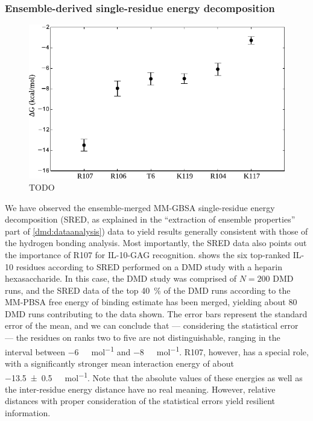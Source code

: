 \subsubsection{Ensemble-derived single-residue energy decomposition}

\begin{figure}
\centering
\includegraphics[width=1.0\textwidth]{gfx/dmdil10/round1_il10_SRED_hpdp6.pdf}
\caption[]{TODO}
\label{fig:dmdil10:SRED_hpdp6}
\end{figure}

We have observed the ensemble-merged MM-GBSA single-residue energy decomposition
(SRED, as explained in the \enquote{extraction of ensemble properties} part of
\cref{dmd:dataanalysis}) data to yield results generally consistent with those
of the hydrogen bonding analysis. Most importantly, the SRED data also points
out the importance of R107 for IL-10-GAG recognition.
 shows the six top-ranked IL-10 residues according
to SRED performed on a DMD study with a heparin hexasaccharide. In this case,
the DMD study was comprised of $N=200$ DMD runs, and the SRED data of the top
\SI{40}{\percent} of the DMD runs according to the MM-PBSA free energy of
binding estimate has been merged, yielding about 80 DMD runs contributing to the
data shown. The error bars represent the standard error of the mean, and we can
conclude that --- considering the statistical error --- the residues on ranks
two to five are not distinguishable, ranging in the interval between
\SI{-6}{\kilo\calory\per\mol} and \SI{-8}{\kilo\calory\per\mol}. R107, however,
has a special role, with a significantly stronger mean interaction energy of
about \SI{-13.5 +- 0.5}{\kilo\calory\per\mol}. Note that the absolute values of
these energies as well as the inter-residue energy distance have no real
meaning. However, relative distances with proper consideration of the
statistical errors yield resilient information.

